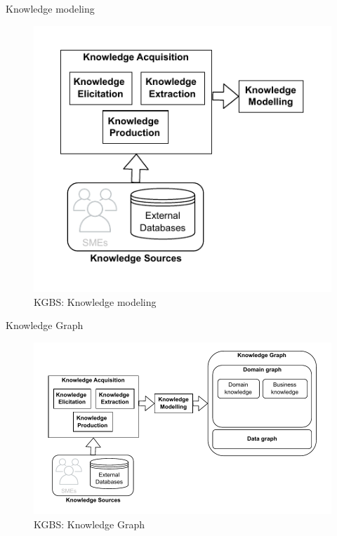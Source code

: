 \begin{frame}{Knowledge modeling}

    \begin{figure} [H]
        \begin{center}
            \includegraphics[scale=0.8]{images/KGBS-knowledge-modelling.pdf} 
            \caption{KGBS: Knowledge modeling} 
        \end{center}
    \end{figure}

\end{frame}

\begin{frame}{Knowledge Graph}

    \begin{figure} [H]
        \begin{center}
            \includegraphics[scale=0.6]{images/KGBS-knowledge-modelling-kg.pdf} 
            \caption{KGBS: Knowledge Graph} 
        \end{center}
    \end{figure}

\end{frame}

